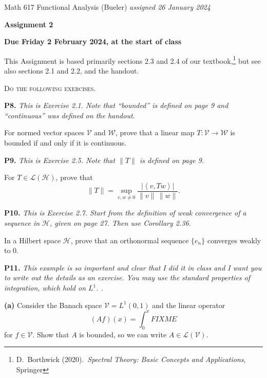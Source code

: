 \documentclass[12pt]{amsart}
\newcommand{\cH}{\mathcal{H}}
\newcommand{\cL}{\mathcal{L}}
\newcommand{\cV}{\mathcal{V}}
\newcommand{\cW}{\mathcal{W}}
\newcommand{\ip}[2]{\ensuremath{\left<#1,#2\right>}}
\newcommand{\prob}[1]{\bigskip\noindent\textbf{#1.}\quad }
\newcommand{\epart}[1]{\medskip\noindent\textbf{(#1)}\quad }
\newcommand{\nex}{\medskip\noindent}
\begin{document}
\scriptsize \noindent Math 617 Functional Analysis (Bueler) \hfill \emph{assigned 26 January 2024}
\normalsize\medskip

\Large\centerline{\textbf{Assignment 2}}
\large
\medskip

\centerline{\textbf{Due Friday 2 February 2024, at the start of class}}
\medskip
\normalsize

\thispagestyle{empty}

\bigskip
\noindent This Assignment is based primarily sections 2.3 and 2.4 of our textbook,\footnote{D.~Borthwick (2020).~\emph{Spectral Theory: Basic Concepts and Applications}, Springer} but see also sections 2.1 and 2.2, and the handout.

\medskip
\noindent \textsc{Do the following exercises.}
\smallskip

\prob{P8}  \emph{This is Exercise 2.1.  Note that ``bounded'' is defined on page 9 and ``continuous'' was defined on the handout.}

\nex For normed vector spaces $\cV$ and $\cW$, prove that a linear map $T:\cV\to\cW$ is bounded if and only if it is continuous.


\prob{P9}  \emph{This is Exercise 2.5.  Note that $\|T\|$ is defined on page 9.}

\nex For $T\in\cL(\cH)$, prove that
	$$\|T\| = \sup_{v,w\ne 0} \frac{|\ip{v}{Tw}|}{\|v\|\,\|w\|}.$$


\prob{P10}  \emph{This is Exercise 2.7.  Start from the definition of weak convergence of a sequence in $\cH$, given on page 27.  Then use Corollary 2.36.}

\nex In a Hilbert space $\cH$, prove that an orthonormal sequence $\{e_n\}$ converges weakly to 0. 


\prob{P11}  \emph{This example is so important and clear that I did it in class \emph{and} I want you to write out the details as an exercise.  You may use the standard properties of integration, which hold on $L^1$.  .}

\epart{a}  Consider the Banach space $\cV = L^1(0,1)$ and the linear operator
	$$(Af)(x) = \int_0^x FIXME$$
for $f\in\cV$.  Show that $A$ is bounded, so we can write $A\in\cL(\cV)$.
\end{document}
